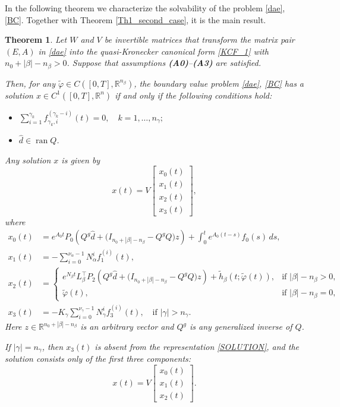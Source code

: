 \documentclass[preprint,12pt]{elsarticle}
\numberwithin{equation}{section}
\newtheorem{theorem}{Theorem}[section]
\theoremstyle{definition}
\begin{document}
In the following theorem we characterize the solvability of the problem \eqref{dae}, \eqref{BC}. Together with Theorem \ref{Th1_second_case}, it is the main result.


\begin{theorem}\label{Th1}
Let \( W \) and \( V \) be invertible matrices that transform the matrix pair \( (E, A) \) in \eqref{dae} into the quasi-Kronecker canonical form \eqref{KCF_1} with
\(n_0 + |\beta| - n_{\beta} > 0\). Suppose that assumptions \textnormal{\textbf{(A0)}--\textbf{(A3)}} are satisfied.

Then, for any \( \widetilde{\varphi} \in C([0,T],\mathbb{R}^{n_{\beta}}) \), the boundary value problem \eqref{dae}, \eqref{BC} has a solution \( x \in C^1([0,T],\mathbb{R}^n) \) if and only if the following conditions hold:
\begin{itemize}
    \item[\emph{(a)}] \(
        \sum\limits_{i=1}^{\gamma_k} f_{\gamma_k,i}^{(\gamma_k - i)}(t) = 0,\quad  k = 1,\ldots,n_{\gamma};
    \)
    \item[\emph{(b)}] \( \widehat{d} \in \operatorname{ran} Q \).
\end{itemize}

Any solution \( x \) is given by
\begin{equation}\label{SOLUTION}
    x(t) = V
\begin{bmatrix}
x_0(t) \\
x_1(t) \\
x_2(t) \\
x_3(t)
\end{bmatrix},
\end{equation}
where
\begin{align*}
x_0(t) &= e^{A_0 t} P_0 \left(Q^g \widehat{d} + \big(I_{n_0 + |\beta| - n_{\beta}} - Q^g Q\big) z\right) 
          + \int_0^t e^{A_0(t - s)} f_0(s)\, ds, \\
x_1(t) &= -\sum\limits_{i=0}^{\nu_{\alpha} - 1} N_{\alpha}^i f_1^{(i)}(t), \\
x_2(t) &=\begin{cases}
   e^{N_{\beta} t} L_{\beta}^\top P_2 \left(Q^g \widehat{d} + \big(I_{n_0 + |\beta| - n_{\beta}} - Q^g Q\big) z\right) + \widetilde{h}_{\beta}(t;\widetilde{\varphi}(t)), & \text{if } |\beta|-n_{\beta}>0,\\
   \widetilde{\varphi}(t), & \text{if } |\beta|-n_{\beta}=0,
\end{cases} \\
x_3(t) &= -K_{\gamma} \sum\limits_{i=0}^{\nu_{\gamma} - 1} N_{\gamma}^i f_3^{(i)}(t), \quad \text{if } |\gamma| > n_\gamma.
\end{align*}
Here \( z \in \mathbb{R}^{n_0 + |\beta| - n_{\beta}} \) is an arbitrary vector 
and \(Q^g\) is any generalized inverse of \(Q\).
\smallskip

If \( |\gamma| = n_{\gamma} \), then \( x_3(t) \) is absent from the representation \eqref{SOLUTION}, and the solution consists only of the first three components:
\[
x(t) = V
\begin{bmatrix}
x_0(t) \\
x_1(t) \\
x_2(t)
\end{bmatrix}.
\]
\end{theorem}
\end{document}
